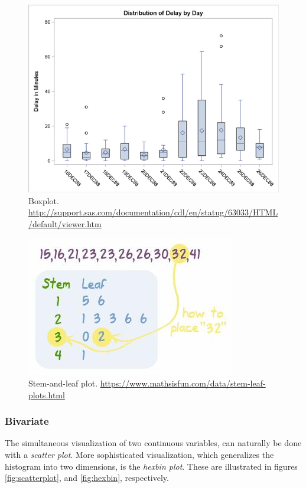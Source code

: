 \documentclass[12pt,a4paper]{report}
\theoremstyle{plain}
\theoremstyle{definition}
\begin{document}
\begin{figure}[h]
\centering
\includegraphics[height=0.3\textheight]{art/ex6aout}
\caption[BoxPlot]{Boxplot. \newline \url{http://support.sas.com/documentation/cdl/en/statug/63033/HTML/default/viewer.htm}}
\label{fig:boxplot}
\end{figure}



\begin{figure}[h]
\centering
\includegraphics[height=0.3\textheight]{art/stem_and_leaf}
\caption[Stem and Leaf Pot]{Stem-and-leaf plot. \newline
\url{https://www.mathsisfun.com/data/stem-leaf-plots.html}}
\label{fig:stem_and_leaf}
\end{figure}




\subsubsection{Bivariate}
The simultaneous visualization of two continuous variables, can naturally be done with a \emph{scatter plot}.
More sophisticated visualization, which generalizes the histogram into two dimensions, is the \emph{hexbin plot}.  
These are illustrated in figures \ref{fig:scatterplot}, and \ref{fig:hexbin}, respectively. 
\end{document}
